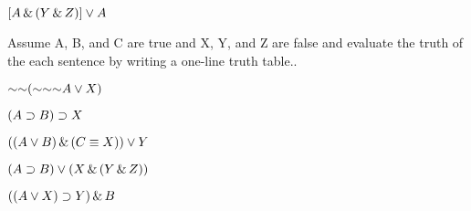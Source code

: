 \begin{exercises}
\item $[A \,\&\, (Y \,\&\, Z)] \vee A $

\end{exercises}


\noindent\problempart
Assume A, B, and C are true and X, Y, and Z are false and evaluate the truth of the each sentence by writing a one-line truth table.. 


\begin{exercises}
\item $\mathord{\sim}  \mathord{\sim}  (\mathord{\sim}  \mathord{\sim}  \mathord{\sim} A  \vee  X) $


\item $(A \supset B) \supset X$	


\item $((A \vee B) \,\&\, (C \equiv X)) \vee Y$	


\item $(A \supset 	B)	\vee 	(X 	\,\&\, 	(Y 	\,\&\, 	Z))$	


\item $((A  	\vee 	X) \supset Y) 	\,\&\, B $


\end{exercises}

